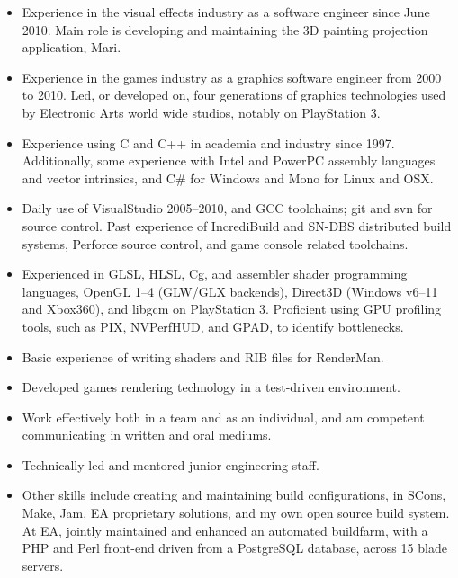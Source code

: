 \documentclass[a4paper,12pt]{article}
\newcommand{\me}{Mark Final BSc (Hons) AMIMA}
\newcommand{\cvheading}[1]{{\medskip\noindent\hspace{-5mm}{\sc #1}\par}}
\begin{document}
\cvheading{Professional Skills}
\begin{itemize}
\item Experience in the visual effects industry as a software engineer since June 2010. Main role is developing and maintaining the 3D painting projection application, Mari.
\item Experience in the games industry as a graphics software engineer from 2000 to 2010. Led, or developed on, four generations of graphics technologies used by Electronic Arts world wide studios, notably on PlayStation 3.
\item Experience using C and C++ in academia and industry since 1997. Additionally, some experience with Intel and PowerPC assembly languages and vector intrinsics, and C\# for Windows and Mono for Linux and OSX.
\item Daily use of VisualStudio 2005--2010, and GCC toolchains; git and svn for source control. Past experience of IncrediBuild and SN-DBS distributed build systems, Perforce source control, and game console related toolchains.
\item Experienced in GLSL, HLSL, Cg, and assembler shader programming languages, OpenGL 1--4 (GLW/GLX backends), Direct3D (Windows v6--11 and Xbox360), and libgcm on PlayStation 3. Proficient using GPU profiling tools, such as PIX, NVPerfHUD, and GPAD, to identify bottlenecks.
\item Basic experience of writing shaders and RIB files for RenderMan.
\item Developed games rendering technology in a test-driven environment.
\item Work effectively both in a team and as an individual, and am competent communicating in written and oral mediums.
\item Technically led and mentored junior engineering staff.
\item Other skills include creating and maintaining build configurations, in SCons, Make, Jam, EA proprietary solutions, and my own open source build system. At EA, jointly maintained and enhanced an automated buildfarm, with a PHP and Perl front-end driven from a PostgreSQL database, across 15 blade servers.
\end{itemize}

\pagebreak
\renewcommand{\thepage}{\tiny{\me\hfill\arabic{page}\hfill Curriculum Vitae}}
\end{document}
